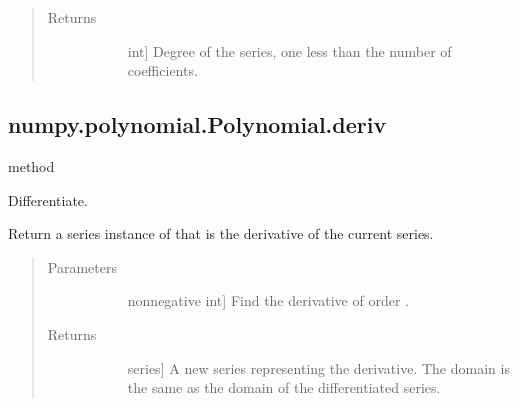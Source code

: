 \documentclass[letterpaper,10pt,english]{sphinxmanual}
\begin{document}
\begin{fulllineitems}
\begin{fulllineitems}
\begin{quote}\begin{description}
\item[{Returns}] \leavevmode\begin{description}
\item[{}] \leavevmode{[}int{]}
Degree of the series, one less than the number of coefficients.

\end{description}

\end{description}\end{quote}

\end{fulllineitems}



\subsection{numpy.polynomial.Polynomial.deriv}
\label{\detokenize{generated/generated/numpy.polynomial.Polynomial.deriv:numpy-polynomial-polynomial-deriv}}\label{\detokenize{generated/generated/numpy.polynomial.Polynomial.deriv::doc}}
method

\begin{fulllineitems}
\label{\detokenize{generated/generated/numpy.polynomial.Polynomial.deriv:numpy.polynomial.Polynomial.deriv}}
Differentiate.

Return a series instance of that is the derivative of the current
series.
\begin{quote}\begin{description}
\item[{Parameters}] \leavevmode\begin{description}
\item[{}] \leavevmode{[}non\sphinxhyphen{}negative int{]}
Find the derivative of order .

\end{description}

\item[{Returns}] \leavevmode\begin{description}
\item[{}] \leavevmode{[}series{]}
A new series representing the derivative. The domain is the same
as the domain of the differentiated series.


\end{description}
\end{description}
\end{quote}
\end{fulllineitems}
\end{fulllineitems}
\end{document}
